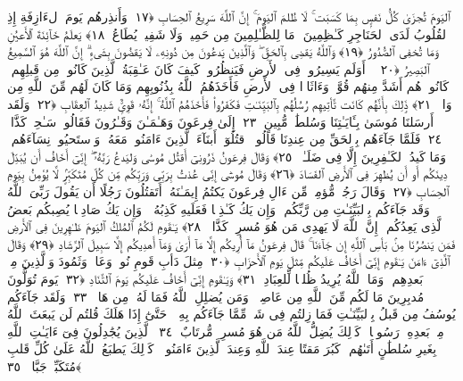  ٱليَومَ تُجزَىٰ كُلُّ نَفسٍۭ بِمَا كَسَبَت ۚ لَا ظُلمَ ٱليَومَ ۚ إِنَّ ٱللَّهَ سَرِيعُ ٱلحِسَابِ ﴿١٧﴾
 وَأَنذِرهُم يَومَ ٱلءَازِفَةِ إِذِ ٱلقُلُوبُ لَدَى ٱلحَنَاجِرِ كَـٰظِمِينَ ۚ مَا لِلظَّـٰلِمِينَ مِن حَمِيمٍۢ وَلَا شَفِيعٍۢ يُطَاعُ ﴿١٨﴾
 يَعلَمُ خَآئِنَةَ ٱلأَعيُنِ وَمَا تُخفِى ٱلصُّدُورُ ﴿١٩﴾
 وَٱللَّهُ يَقضِى بِٱلحَقِّ ۖ وَٱلَّذِينَ يَدعُونَ مِن دُونِهِۦ لَا يَقضُونَ بِشَىءٍ ۗ إِنَّ ٱللَّهَ هُوَ ٱلسَّمِيعُ ٱلبَصِيرُ ﴿٢٠﴾
 ۞ أَوَلَم يَسِيرُوا۟ فِى ٱلأَرضِ فَيَنظُرُوا۟ كَيفَ كَانَ عَـٰقِبَةُ ٱلَّذِينَ كَانُوا۟ مِن قَبلِهِم ۚ كَانُوا۟ هُم أَشَدَّ مِنهُم قُوَّةًۭ وَءَاثَارًۭا فِى ٱلأَرضِ فَأَخَذَهُمُ ٱللَّهُ بِذُنُوبِهِم وَمَا كَانَ لَهُم مِّنَ ٱللَّهِ مِن وَاقٍۢ ﴿٢١﴾
 ذَٟلِكَ بِأَنَّهُم كَانَت تَّأتِيهِم رُسُلُهُم بِٱلبَيِّنَـٰتِ فَكَفَرُوا۟ فَأَخَذَهُمُ ٱللَّهُ ۚ إِنَّهُۥ قَوِىٌّۭ شَدِيدُ ٱلعِقَابِ ﴿٢٢﴾
 وَلَقَد أَرسَلنَا مُوسَىٰ بِـَٔايَـٰتِنَا وَسُلطَٰنٍۢ مُّبِينٍ ﴿٢٣﴾
 إِلَىٰ فِرعَونَ وَهَـٰمَـٰنَ وَقَـٰرُونَ فَقَالُوا۟ سَـٰحِرٌۭ كَذَّابٌۭ ﴿٢٤﴾
 فَلَمَّا جَآءَهُم بِٱلحَقِّ مِن عِندِنَا قَالُوا۟ ٱقتُلُوٓا۟ أَبنَآءَ ٱلَّذِينَ ءَامَنُوا۟ مَعَهُۥ وَٱستَحيُوا۟ نِسَآءَهُم ۚ وَمَا كَيدُ ٱلكَـٰفِرِينَ إِلَّا فِى ضَلَـٰلٍۢ ﴿٢٥﴾
 وَقَالَ فِرعَونُ ذَرُونِىٓ أَقتُل مُوسَىٰ وَليَدعُ رَبَّهُۥٓ ۖ إِنِّىٓ أَخَافُ أَن يُبَدِّلَ دِينَكُم أَو أَن يُظهِرَ فِى ٱلأَرضِ ٱلفَسَادَ ﴿٢٦﴾
 وَقَالَ مُوسَىٰٓ إِنِّى عُذتُ بِرَبِّى وَرَبِّكُم مِّن كُلِّ مُتَكَبِّرٍۢ لَّا يُؤمِنُ بِيَومِ ٱلحِسَابِ ﴿٢٧﴾
 وَقَالَ رَجُلٌۭ مُّؤمِنٌۭ مِّن ءَالِ فِرعَونَ يَكتُمُ إِيمَـٰنَهُۥٓ أَتَقتُلُونَ رَجُلًا أَن يَقُولَ رَبِّىَ ٱللَّهُ وَقَد جَآءَكُم بِٱلبَيِّنَـٰتِ مِن رَّبِّكُم ۖ وَإِن يَكُ كَـٰذِبًۭا فَعَلَيهِ كَذِبُهُۥ ۖ وَإِن يَكُ صَادِقًۭا يُصِبكُم بَعضُ ٱلَّذِى يَعِدُكُم ۖ إِنَّ ٱللَّهَ لَا يَهدِى مَن هُوَ مُسرِفٌۭ كَذَّابٌۭ ﴿٢٨﴾
 يَـٰقَومِ لَكُمُ ٱلمُلكُ ٱليَومَ ظَـٰهِرِينَ فِى ٱلأَرضِ فَمَن يَنصُرُنَا مِنۢ بَأسِ ٱللَّهِ إِن جَآءَنَا ۚ قَالَ فِرعَونُ مَآ أُرِيكُم إِلَّا مَآ أَرَىٰ وَمَآ أَهدِيكُم إِلَّا سَبِيلَ ٱلرَّشَادِ ﴿٢٩﴾
 وَقَالَ ٱلَّذِىٓ ءَامَنَ يَـٰقَومِ إِنِّىٓ أَخَافُ عَلَيكُم مِّثلَ يَومِ ٱلأَحزَابِ ﴿٣٠﴾
 مِثلَ دَأبِ قَومِ نُوحٍۢ وَعَادٍۢ وَثَمُودَ وَٱلَّذِينَ مِنۢ بَعدِهِم ۚ وَمَا ٱللَّهُ يُرِيدُ ظُلمًۭا لِّلعِبَادِ ﴿٣١﴾
 وَيَـٰقَومِ إِنِّىٓ أَخَافُ عَلَيكُم يَومَ ٱلتَّنَادِ ﴿٣٢﴾
 يَومَ تُوَلُّونَ مُدبِرِينَ مَا لَكُم مِّنَ ٱللَّهِ مِن عَاصِمٍۢ ۗ وَمَن يُضلِلِ ٱللَّهُ فَمَا لَهُۥ مِن هَادٍۢ ﴿٣٣﴾
 وَلَقَد جَآءَكُم يُوسُفُ مِن قَبلُ بِٱلبَيِّنَـٰتِ فَمَا زِلتُم فِى شَكٍّۢ مِّمَّا جَآءَكُم بِهِۦ ۖ حَتَّىٰٓ إِذَا هَلَكَ قُلتُم لَن يَبعَثَ ٱللَّهُ مِنۢ بَعدِهِۦ رَسُولًۭا ۚ كَذَٟلِكَ يُضِلُّ ٱللَّهُ مَن هُوَ مُسرِفٌۭ مُّرتَابٌ ﴿٣٤﴾
 ٱلَّذِينَ يُجَٰدِلُونَ فِىٓ ءَايَـٰتِ ٱللَّهِ بِغَيرِ سُلطَٰنٍ أَتَىٰهُم ۖ كَبُرَ مَقتًا عِندَ ٱللَّهِ وَعِندَ ٱلَّذِينَ ءَامَنُوا۟ ۚ كَذَٟلِكَ يَطبَعُ ٱللَّهُ عَلَىٰ كُلِّ قَلبِ مُتَكَبِّرٍۢ جَبَّارٍۢ ﴿٣٥﴾
